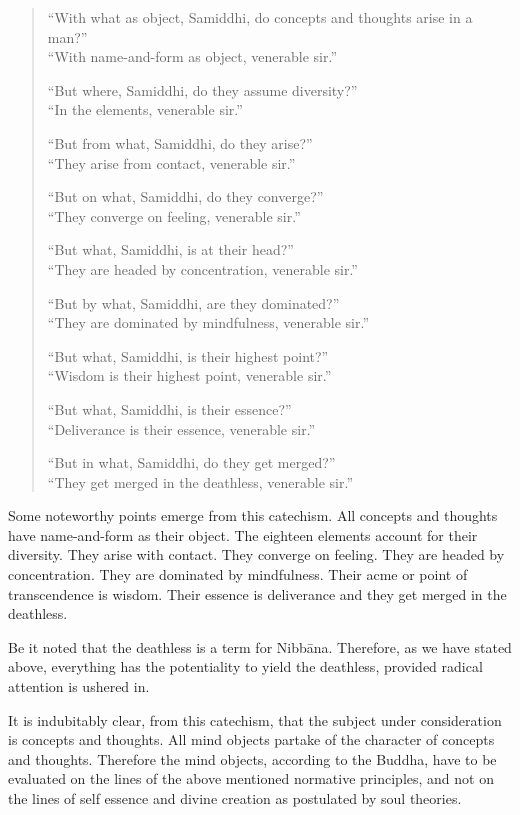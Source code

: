 \begin{quote}
``With what as object, Samiddhi, do concepts and thoughts arise in a man?''\\
``With name-and-form as object, venerable sir.''

``But where, Samiddhi, do they assume diversity?''\\
``In the elements, venerable sir.''

``But from what, Samiddhi, do they arise?''\\
``They arise from contact, venerable sir.''

``But on what, Samiddhi, do they converge?''\\
``They converge on feeling, venerable sir.''

``But what, Samiddhi, is at their head?''\\
``They are headed by concentration, venerable sir.''

``But by what, Samiddhi, are they dominated?''\\
``They are dominated by mindfulness, venerable sir.''

``But what, Samiddhi, is their highest point?''\\
``Wisdom is their highest point, venerable sir.''

``But what, Samiddhi, is their essence?''\\
``Deliverance is their essence, venerable sir.''

``But in what, Samiddhi, do they get merged?''\\
``They get merged in the deathless, venerable sir.''
\end{quote}

Some noteworthy points emerge from this catechism. All concepts and thoughts have name-and-form as their object. The eighteen elements account for their diversity. They arise with contact. They converge on feeling. They are headed by concentration. They are dominated by mindfulness. Their acme or point of transcendence is wisdom. Their essence is deliverance and they get merged in the deathless.

Be it noted that the deathless is a term for Nibbāna. Therefore, as we have stated above, everything has the potentiality to yield the deathless, provided radical attention is ushered in.

It is indubitably clear, from this catechism, that the subject under consideration is concepts and thoughts. All mind objects partake of the character of concepts and thoughts. Therefore the mind objects, according to the Buddha, have to be evaluated on the lines of the above mentioned normative principles, and not on the lines of self essence and divine creation as postulated by soul theories.

